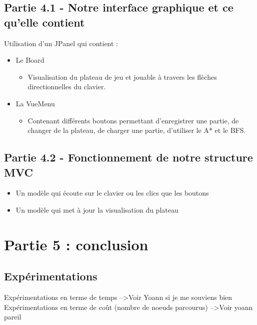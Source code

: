 \documentclass{beamer} %
\begin{document}
	\subsection{Partie 4.1 - Notre interface graphique et ce qu'elle contient}
\begin{frame}[plain]
Utilisation d'un JPanel qui contient : 
	\begin{itemize}
		\item Le Board
			\begin{itemize}
				\item Visualisation du plateau de jeu et jouable à travers les flèches directionnelles du clavier.
			\end{itemize}
		\item La VueMenu 
			\begin{itemize}
				\item Contenant différents boutons permettant d'enregistrer une partie, de changer de la plateau, de charger une partie, d'utiliser le A* et le BFS.
			\end{itemize}
	\end{itemize}

\end{frame}
	
	
	\subsection{Partie 4.2 - Fonctionnement de notre structure MVC}
\begin{frame}[plain]
\begin{itemize}
	\item Un modèle qui écoute sur le clavier ou les clics que les boutons
	\item Un modèle qui met à jour la visualisation du plateau
\end{itemize}
\end{frame}

\section{Partie 5 : conclusion}
	\subsection{Expérimentations}
\begin{frame}[plain]
Expérimentations en terme de temps  -->Voir Yoann si je me souviens bien
Expérimentations en terme de coût (nombre de noeuds parcourus) -->Voir yoann pareil
\end{frame}
\end{document}
